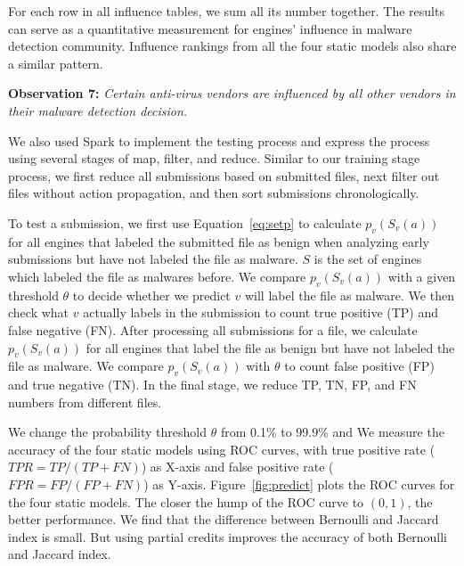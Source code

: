 For each row in all influence tables, we sum all its number together. 
The results can serve as a quantitative measurement for engines' influence in malware detection community. 
Influence rankings from all the four static models also share a similar pattern. 

{\bf Observation 7:} 
{\em Certain anti-virus vendors are influenced by all other vendors in their malware detection decision.}

We also used Spark to implement the testing process and express the process using several stages of map, filter, and reduce.
Similar to our training stage process, 
we first reduce all submissions based on submitted files,
next filter out files without action propagation, 
and then sort submissions chronologically. 

To test a submission, we first use Equation~\ref{eq:setp} to
calculate $p_v(S_v(a))$ for all engines
that labeled the submitted file as benign when analyzing early submissions 
but have not labeled the file as malware. 
$S$ is the set of engines which labeled the file as malwares before.
We compare $p_v(S_v(a))$ with a given threshold $\theta$ to decide whether we predict 
$v$ will label the file as malware.
We then check what $v$ actually labels in the submission to count true positive (TP) and false negative (FN). 
After processing all submissions for a file, 
we calculate $p_v(S_v(a))$ for all engines  
that label the file as benign but have not labeled the file as malware.
We compare $p_v(S_v(a))$ with $\theta$ to count false positive (FP) and true negative (TN).
In the final stage, we reduce TP, TN, FP, and FN numbers from different files.



We change the probability threshold $\theta$ from 0.1\% to 99.9\% 
and 
We measure the accuracy of the four static models using ROC curves, 
with true positive rate ($TPR = TP/(TP+FN)$) as X-axis
and false positive rate ($FPR = FP/(FP + FN)$) as Y-axis. 
Figure~\ref{fig:predict} plots the ROC curves for the four static models.
The closer the hump of the ROC curve to $(0,1)$, the better performance.
We find that the difference between Bernoulli and Jaccard index is small.
But using partial credits improves the accuracy of both Bernoulli and Jaccard index.

